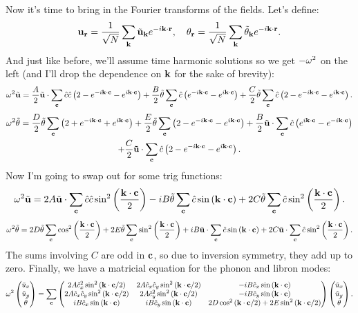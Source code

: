 \documentclass[12pt]{article}
\begin{document}
Now it's time to bring in the Fourier transforms of the fields. Let's define:
\[ \bv u_\br = \recip{\sqrt N}\sum_{\bv k} \tilde{\bv u}_{\bv k} e^{-i \Dot k r},\quad \th_\br = \recip{\sqrt N}\sum_{\bv k} \tilde \th_{\bv k} e^{-i \Dot k r}.\]
And just like before, we'll assume time harmonic solutions so we get $-\w^2$ on the left (and I'll drop the dependence on $\bv k$ for the sake of brevity):
\[ \w^2  \tilde{\bv u} = \half{A} \tilde{\bv u} \cdot \sum_{\bv c} \hat c \hat c \paren{2 - e^{-i\Dot k c} - e^{i \Dot k c}} + \half{B} \tilde \th \sum_{\bv c} \hat c\paren{e^{-i \Dot k c} - e^{i \Dot k c}} + \half{C} \tilde \th \sum_{\bv c} \hat c \paren{2 - e^{-i \Dot k c} - e^{i \Dot k c}}.\]
\begin{multline*} \w^2  \tilde \th = \half{D}\tilde \th \sum_{\bv c} \paren{2 + e^{-i \Dot k c} + e^{i \Dot k c}} + \half{E} \tilde \th \sum_{\bv c} \paren{ 2 - e^{- i \Dot k c} - e^{i \Dot k c}} + \half{B} \tilde{\bv u} \cdot \sum_{\bv c} \hat c \paren{e^{i \Dot k c} - e^{-i \Dot k c}} \\ + \half{C} \bv{\tilde u} \cdot \sum_{\bv c} \hat c \paren{2 - e^{-i \Dot k c} - e^{i \Dot k c}}. \end{multline*}
Now I'm going to swap out for some trig functions:
\[ \w^2  \tilde{\bv u} = 2A\tilde{\bv u} \cdot \sum_{\bv c} \hat c \hat c \sin^2\paren{\half{\Dot k c}} - i B\tilde \th \sum_{\bv c} \hat c\sinp{\Dot k c} + 2C \tilde \th \sum_{\bv c} \hat c \sin^2\paren{\half{\Dot k c}}.\]
\[ \w^2  \tilde \th = 2D\tilde \th \sum_{\bv c} \cos^2\paren{\half{\Dot k c}}+ 2E \tilde \th \sum_{\bv c} \sin^2\paren{\half{\Dot k c}} + iB \tilde{\bv u} \cdot \sum_{\bv c} \hat c \sinp{\Dot k c} + 2C \tilde{\bv u} \cdot \sum_{\bv c} \hat c \sin^2\paren{\half{\Dot k c}}.\]
The sums involving $C$ are odd in $\bv c$, so due to inversion symmetry, they add up to zero. Finally, we have a matricial equation for the phonon and libron modes:
\[ \w^2 \pmtrx{ \tilde u_x \\ \tilde u_y \\ \tilde \th} = \sum_{\bv c} \pmtrx{ 2A \hat c_x^2 \sin^2\paren{\Dot k c/2} & 2A \hat c_x \hat c_y \sin^2 \paren{\Dot k c/2} & - i B \hat c_x \sinp{\Dot k c} \\ 2A \hat c_x \hat c_y \sin^2\paren{\Dot k c/2} & 2A \hat c_y^2 \sin^2 \paren{\Dot k c/2} & - i B \hat c_y \sinp{\Dot k c} \\ i B \hat c_x \sinp{\Dot k c} & i B \hat c_y \sinp{\Dot k c} & 2D \cos^2\paren{\Dot k c/2} + 2E \sin^2 \paren{ \Dot k c/2}}  \pmtrx{ \tilde u_x \\ \tilde u_y \\ \tilde \th}. \]
\end{document}
